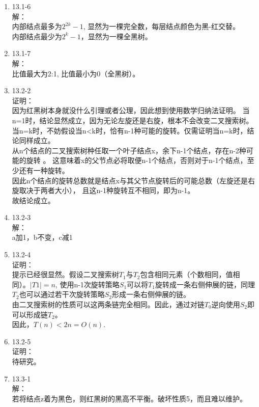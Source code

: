 \documentclass[UTF8]{ctexart}
\begin{document}
\begin{enumerate}
	\item 13.1-6 \\
	解：\\
		内部结点最多为$2^{2k}-1$, 显然为一棵完全数，每层结点颜色为黑-红交替。\\
		内部结点最少为$2^k-1$，显然为一棵全黑树。
		
	\item 13.1-7 \\
	解：\\
		比值最大为2:1, 比值最小为0（全黑树）。
		
	\item 13.2-2 \\
	证明：\\
		因为红黑树本身就没什么引理或者公理，因此想到使用数学归纳法证明。
		当n=1时，结论显然成立，因为无论左旋还是右旋，根本不会改变二叉搜索树。
		当n=k时，不妨假设当n<k时，恰有n-1种可能的旋转。仅需证明当n=k时，结论同样成立。\\
		从n个结点的二叉搜索树种任取一个叶子结点x，余下n-1个结点，存在n-2种可能的旋转 。
		这意味着x的父节点必将取便n-1个结点，否则对于n-1个结点，至少还有一种旋转。\\
		因此n个结点的旋转总数就是结点x与其父节点旋转后的可能总数（左旋还是右旋取决于两者大小），
		且这n-1种旋转互不相同，即为n-1。\\
		故结论成立。
		
	\item 13.2-3 \\
	解：\\
		a加1，b不变，c减1
		
	\item 13.2-4 \\
	证明：\\
		提示已经很显然。假设二叉搜索树$T_1$与$T_2$包含相同元素（个数相同，值相同）。$|T1| = n$,
		使用n-1次旋转策略$S_1$可以将$T_1$旋转成一条右侧伸展的链，同理$T_2$也可以通过若干次旋转策略$S_2$形成一条右侧伸展的链。\\
		由二叉搜索树的性质可以这两条链完全相同。因此，通过对链$T_0$逆向使用$S_2$即可以形成链$T_2$。\\
		因此，$T(n) < 2n = O(n)$.
		
	\item 13.2-5 \\
	证明：\\
		待研究。
		
	\item 13.3-1 \\
	解：\\
		若将结点z着为黑色，则红黑树的黑高不平衡。破坏性质5，而且难以维护。
		

\end{enumerate}
\end{document}
